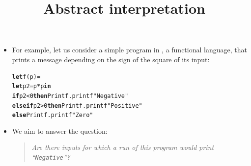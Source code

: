 \documentclass[wide]{slides}
\begin{document}
\begin{slide}
  \title{Abstract interpretation}

  \begin{itemize}

    \item For example, let us consider a simple program in \OCaml, a
      functional language, that prints a message depending on the sign
      of the square of its input:
\begin{alltt}

\textbf{let} f (p) =
  \textbf{let} p2 = p * p \textbf{in}
  \textbf{if} p2 < 0 \textbf{then} Printf.printf "Negative"
  \textbf{else} \textbf{if} p2 > 0 \textbf{then} Printf.printf "Positive"
        \textbf{else} Printf.printf "Zero"

\end{alltt}

    \item We aim to answer the question:
      \begin{quote}
        \textit{Are there inputs for which a run of this program would
          print ``\texttt{Negative}''?}
      \end{quote}

  \end{itemize}

\end{slide}
\end{document}
